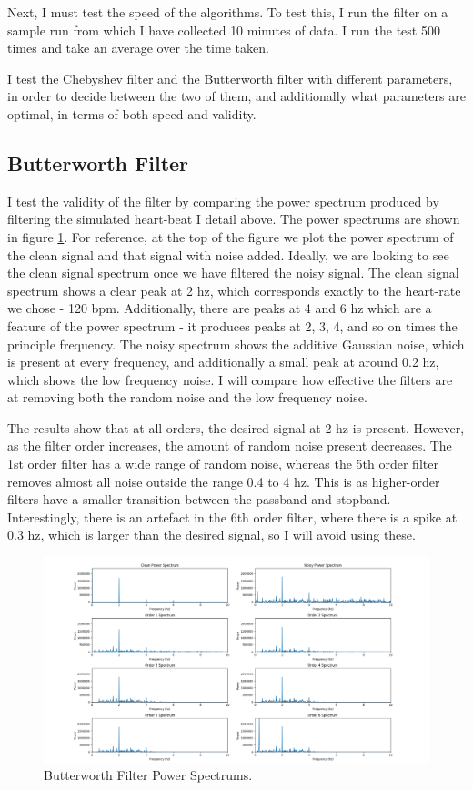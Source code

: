 \documentclass[12pt,a4paper,twoside,openright]{report}
\begin{document}
Next, I must test the speed of the algorithms. To test this, I run the filter
on a sample run from which I have collected 10 minutes of data. I run the test
500 times and take an average over the time taken.

I test the Chebyshev filter and the Butterworth filter with different
parameters, in order to decide between the two of them, and additionally what
parameters are optimal, in terms of both speed and validity.

\subsection{Butterworth Filter}

I test the validity of the filter by comparing the power spectrum produced by
filtering the simulated heart-beat I detail above. The power spectrums are
shown in figure 
\ref{fig:butterworth-validity}. For reference, at the top of the figure we
plot the power spectrum of the clean signal and that signal with noise added.
Ideally, we are looking to see the clean signal spectrum once we have filtered the
noisy signal. The clean signal spectrum shows a clear peak at 2 hz, which
corresponds exactly to the heart-rate we chose - 120 bpm. Additionally, there
are peaks at 4 and 6 hz which are a feature of the power spectrum - it
produces peaks at 2, 3, 4, and so on times the principle frequency. The noisy
spectrum shows the additive Gaussian noise, which is present at every
frequency, and additionally a small peak at around 0.2 hz, which shows the low
frequency noise. I will compare how effective the filters are at removing both
the random noise and the low frequency noise.

The results show that at all orders, the desired signal at 2 hz is present.
However, as the filter order increases, the amount of random noise present
decreases. The 1st order filter has a wide range of random noise, whereas the
5th order filter removes almost all noise outside the range 0.4 to 4 hz. This
is as higher-order filters have a smaller transition between the passband and
stopband.
Interestingly, there is an artefact in the 6th order filter, where there is a
spike at 0.3 hz, which is larger than the desired signal, so I will avoid
using these. 

\begin{figure}
	\centering
	\includegraphics[width=\textwidth]{figs/butterworth-validity.png}
	\caption{Butterworth Filter Power Spectrums.}
	\label{fig:butterworth-validity}
\end{figure}
\end{document}
